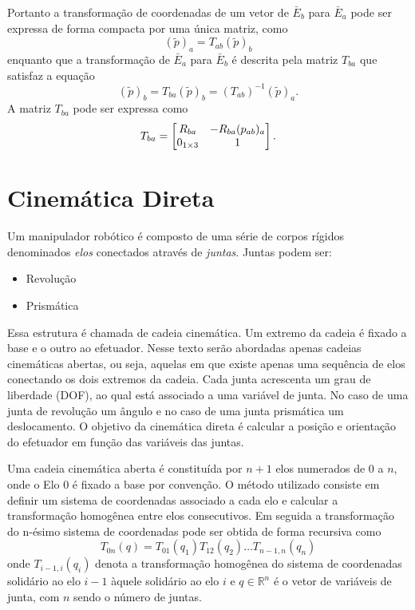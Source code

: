 Portanto a transformação de coordenadas de um vetor de $\bar{E}_b$ para $\bar{E}_a$ pode ser expressa de forma compacta por uma única matriz, como
\begin{equation}
(\tilde{p})_a = T_{ab} (\tilde{p})_b
\end{equation}
enquanto que a transformação de $\bar{E}_a$ para $\bar{E}_b$ é descrita pela matriz $T_{ba}$ que satisfaz a equação
\begin{equation}
(\tilde{p})_b = T_{ba} (\tilde{p})_b = (T_{ab})^{-1} (\tilde{p})_a .
\end{equation}
A matriz $T_{ba}$ pode ser expressa como
\begin{equation}
T_{ba} = \begin{bmatrix}
    R_{ba} & -R_{ba}(p_{ab})_a \\
    0_{1 \times 3} & 1
\end{bmatrix}.
\end{equation}

\section{Cinemática Direta}
Um manipulador robótico é composto de uma série de corpos rígidos denominados \textit{elos} conectados através de \textit{juntas}. 
Juntas podem ser:
\begin{itemize} 
\item Revolução
\item Prismática
\end{itemize}

Essa estrutura é chamada de cadeia cinemática.
Um extremo da cadeia é fixado a base e o outro ao efetuador.
Nesse texto serão abordadas apenas cadeias cinemáticas abertas, ou seja, aquelas em que existe apenas uma sequência de elos conectando os dois extremos da cadeia.
Cada junta acrescenta um grau de liberdade (DOF), ao qual está associado a uma variável de junta. No caso de uma junta de revolução um ângulo e no caso de uma junta prismática um deslocamento.
O objetivo da cinemática direta é calcular a posição e orientação do efetuador em função das variáveis das juntas.


Uma cadeia cinemática aberta é constituída por $n+1$ elos numerados de $0$ a $n$, onde o Elo 0 é fixado a base por convenção. O método utilizado consiste em definir um sistema de coordenadas associado a cada elo e calcular a transformação homogênea entre elos consecutivos. Em seguida a transformação do n-ésimo sistema de coordenadas pode ser obtida de forma recursiva como
\begin{equation}\label{eq:cinedireta}
{T}_{0n}({q}) = {T}_{01}(q_1) {T}_{12}(q_{2}) {\dots} {T}_{n-1,n}(q_n)
\end{equation}
onde ${T}_{i-1,i}(q_i)$ denota a transformação homogênea do sistema de coordenadas solidário ao elo $i-1$ àquele solidário ao elo $i$ e $q \in \mathbb{R}^n$ é o vetor de variáveis de junta, com $n$ sendo o número de juntas.

